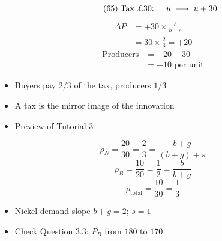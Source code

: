 \begin{frame}[plain,label=w2_rn_q24c]
  \Large
  \[
    \tag{65}\;\text{Tax \pounds 30: } \quad u \;\longrightarrow\; u + 30
  \]
  \begin{align*}
    \tag{66}\;\Delta P &= +30 \times \frac{b}{b + s}\\
                       &= 30 \times \frac{2}{3} = +20
  \end{align*}
  \begin{align*}
    \tag{67}\;\text{Producers} &= +20 - 30\\
                               &= -10 \text{ per unit}
  \end{align*}

  \vspace{0.3em}
  \begin{itemize}\Large
    \item Buyers pay $2/3$ of the tax, producers $1/3$
    \item A tax is the mirror image of the innovation
    \item Preview of Tutorial 3
  \end{itemize}
\end{frame}

\begin{frame}[plain,label=w2_24_we8b]
  \Large
  \[
    \tag{79}\;\rho_N = \frac{20}{30} = \frac{2}{3} = \frac{b + g}{(b + g) + s}
  \]
  \[
    \tag{80}\;\rho_B = \frac{10}{20} = \frac{1}{2} = \frac{b}{b + g}
  \]
  \[
    \tag{81}\;\rho_{\text{total}} = \frac{10}{30} = \frac{1}{3}
  \]

  \vspace{0.3em}
  \begin{itemize}\Large
    \item Nickel demand slope $b + g = 2$; $s = 1$
    \item Check Question 3.3: $P_B$ from $180$ to $170$
  \end{itemize}
\end{frame}

